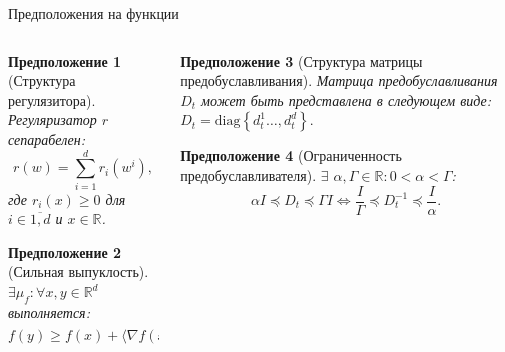\documentclass[aspectratio=169, 12pt]{beamer}
\newtheorem{assumption_rus}{Предположение}
\begin{document}
\begin{frame}{Предположения на функции}

\begin{columns}[t]
    \begin{column}{0.48\textwidth}
        \vspace{-0.5cm}
        \begin{assumption_rus}[Структура регулязитора]
    \label{ass:regstruct}
    Регуляризатор $r$ сепарабелен:
    $$r(w) = \sum_{i=1}^d r_i(w^i),$$
    где $r_i(x) \ge 0$ для $i \in \overline{1, d}$ и $x \in \mathbb{R}$.
\end{assumption_rus}
\begin{assumption_rus}[Сильная выпуклость]
    \label{ass:muconvex}
    $\exists \mu_f : \forall x, y \in \mathbb{R}^d$ выполняется:
    $$
    f(y) \geq f(x) + \langle \nabla f(x), y-x \rangle + \frac{\mu_f}{2} ||x-y||_2^2.
    $$
\end{assumption_rus}
    \end{column}
    \hspace{0.5cm}
    \vrule
    \hspace{0.5cm}
    \begin{column}{0.48\textwidth}
        \vspace{-0.5cm}
\begin{assumption_rus}[Структура матрицы предобуславливания]
    \label{ass:precondstruct}
    Матрица предобуславливания $D_t$ может быть представлена в следующем виде:
     $D_t = \textrm{diag} \left\{ d_t^1 \ldots, d
_t^d \right\}.$
\end{assumption_rus}
\begin{assumption_rus}[Ограниченность предобуславливателя]
\label{ass:preconditioned}
$\exists$ $\alpha, \Gamma \in \mathbb{R} : 0 < \alpha < \Gamma$:
\begin{equation*}
\alpha I \preccurlyeq D_t \preccurlyeq \Gamma I \Leftrightarrow \frac{I}{\Gamma} \preccurlyeq D_t^{-1} \preccurlyeq \frac{I}{\alpha}.
\end{equation*}
\end{assumption_rus}
    \end{column}
\end{columns}


\end{frame}
\end{document}
